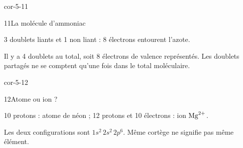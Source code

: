 \begin{blocLivre}{cor-5-11}\begin{corrige}{11}{La molécule d’ammoniac}
\begin{questions}
\item 3 doublets liants et 1 non liant : 8 électrons entourent l’azote.
\item Il y a 4 doublets au total, soit 8 électrons de valence représentés. Les doublets partagés ne se comptent qu’une fois dans le total moléculaire.
\end{questions}
\end{corrige}\end{blocLivre}
\begin{blocLivre}{cor-5-12}\begin{corrige}{12}{Atome ou ion ?}
\begin{questions}
\item 10 protons : atome de néon ; 12 protons et 10 électrons : ion $\ce{Mg^{2+}}$.
\item Les deux configurations sont $1s^2\,2s^2\,2p^6$. Même cortège ne signifie pas même élément.
\end{questions}
\end{corrige}\end{blocLivre}

